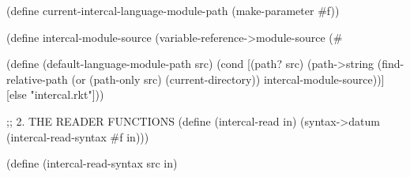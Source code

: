 \begin{CodeBlock}
(define current-intercal-language-module-path
  (make-parameter #f))

(define intercal-module-source
  (variable-reference->module-source
   (#%

(define (default-language-module-path src)
  (cond
    [(path? src)
     (path->string
      (find-relative-path
       (or (path-only src) (current-directory))
       intercal-module-source))]
    [else "intercal.rkt"]))

;; 2. THE READER FUNCTIONS
(define (intercal-read in)
  (syntax->datum (intercal-read-syntax #f in)))

(define (intercal-read-syntax src in)
\end{CodeBlock}
